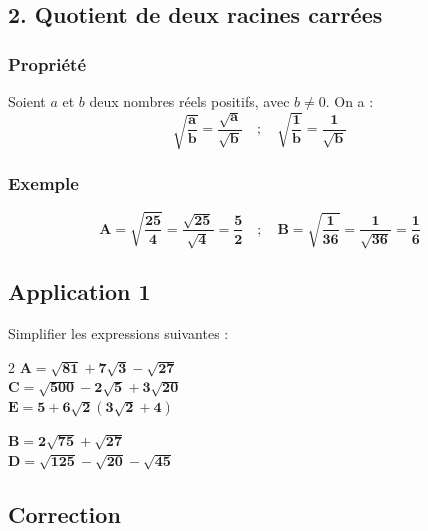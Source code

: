 \documentclass[12pt,a4paper]{article}
\begin{document}
\subsection*{\color{myred} 2. Quotient de deux racines carrées }

\subsubsection*{\color{myred} Propriété}
Soient $a$ et $b$ deux nombres réels positifs, avec $b \neq 0$. On a :
\[
\mathbf{\sqrt{\frac{a}{b}} = \frac{\sqrt{a}}{\sqrt{b}} \quad ; \quad \sqrt{\frac{1}{b}} = \frac{1}{\sqrt{b}}}
\]
\subsubsection*{\color{myred} Exemple }
\[
\mathbf{A = \sqrt{\frac{25}{4}} = \frac{\sqrt{25}}{\sqrt{4}} = \frac{5}{2} \quad ; \quad B = \sqrt{\frac{1}{36}} = \frac{1}{\sqrt{36}} = \frac{1}{6}}
\]
\subsection*{\color{myred} Application 1}
Simplifier les expressions suivantes :

\vspace{0.3cm}
\begin{multicols}{2}
\noindent
$\mathbf{A = \sqrt{81} + 7\sqrt{3} - \sqrt{27}}$ \\[0.3cm]
$\mathbf{C = \sqrt{500} - 2\sqrt{5} + 3\sqrt{20}}$ \\[0.3cm]
$\mathbf{E = 5 + 6\sqrt{2}\left(3\sqrt{2} + 4\right)}$

\columnbreak

\noindent
$\mathbf{B = 2\sqrt{75} + \sqrt{27}}$ \\[0.3cm]
$\mathbf{D = \sqrt{125} - \sqrt{20} - \sqrt{45}}$
\end{multicols}
\subsection*{\color{myred} Correction }
\end{document}
